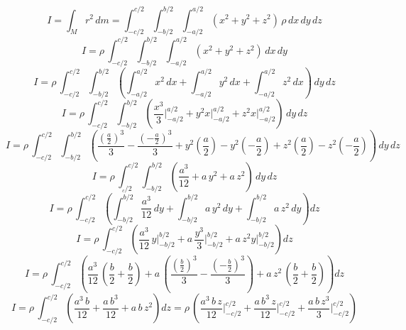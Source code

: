 \documentclass[letter,oneside,11pt]{article}
\begin{document}
\begin{equation*}
    I = \int_{M} r^2\, dm = \int_{-c/2}^{c/2} \int_{-b/2}^{b/2} \int_{-a/2}^{a/2} (x^2 + y^2 + z^2)\, \rho\, dx\, dy\, dz
\end{equation*}
\begin{equation*}
    I = \rho\, \int_{-c/2}^{c/2} \int_{-b/2}^{b/2} \int_{-a/2}^{a/2} (x^2 + y^2 + z^2)\, dx \, dy
\end{equation*}
\begin{equation*}
    I = \rho\, \int_{-c/2}^{c/2} \int_{-b/2}^{b/2} \left( \int_{-a/2}^{a/2} x^2\, dx + \int_{-a/2}^{a/2} y^2\, dx + \int_{-a/2}^{a/2} z^2\, dx \right) \, dy\, dz
\end{equation*}
\begin{equation*}
    I = \rho\, \int_{-c/2}^{c/2} \int_{-b/2}^{b/2} \left( \frac{x^3}{3} \Biggr|_{-a/2}^{a/2} + y^2 x \Biggr|_{-a/2}^{a/2} + z^2 x \Biggr|_{-a/2}^{a/2} \right) \, dy\, dz
\end{equation*}
\begin{equation*}
    I = \rho\, \int_{-c/2}^{c/2} \int_{-b/2}^{b/2} \left( \frac{(\frac{a}{2})^3}{3} - \frac{(-\frac{a}{2})^3}{3} + y^2 \left( \frac{a}{2}\right) - y^2 \left( -\frac{a}{2}\right) + z^2 \left( \frac{a}{2}\right) - z^2 \left( -\frac{a}{2}\right) \right) \, dy\, dz
\end{equation*}
\begin{equation*}
    I = \rho\, \int_{_c/2}^{c/2} \int_{-b/2}^{b/2} \left( \frac{a^3}{12} + a\, y^2 + a\, z^2 \right) \, dy\, dz
\end{equation*}
\begin{equation*}
    I = \rho\, \int_{-c/2}^{c/2} \left( \int_{-b/2}^{b/2} \frac{a^3}{12}\, dy + \int_{-b/2}^{b/2} a\, y^2\, dy + \int_{-b/2}^{b/2} a\, z^2\, dy \right) dz
\end{equation*}
\begin{equation*}
    I = \rho\, \int_{-c/2}^{c/2} \left( \frac{a^3}{12}\, y \Biggr|_{-b/2}^{b/2} + a\, \frac{y^3}{3} \Biggr|_{-b/2}^{b/2} + a\, z^2 y \Biggr|_{-b/2}^{b/2} \right) dz
\end{equation*}
\begin{equation*}
    I = \rho\, \int_{-c/2}^{c/2} \left( \frac{a^3}{12}\, \left( \frac{b}{2} + \frac{b}{2} \right) + a\, \left( \frac{(\frac{b}{2})^3}{3} - \frac{(-\frac{b}{2})^3}{3} \right) + a\, z^2\, \left( \frac{b}{2} + \frac{b}{2} \right) \right) dz
\end{equation*}
\begin{equation*}
    I = \rho\, \int_{-c/2}^{c/2} \left( \frac{a^3\, b}{12} + \frac{a\, b^3}{12} + a\, b\, z^2 \right) dz = \rho\, \left( \frac{a^3\, b\, z}{12} \Biggr|_{-c/2}^{c/2} + \frac{a\, b^3\, z}{12} \Biggr|_{-c/2}^{c/2} + \frac{a\, b\, z^3}{3} \Biggr|_{-c/2}^{c/2} \right)
\end{equation*}
\end{document}
